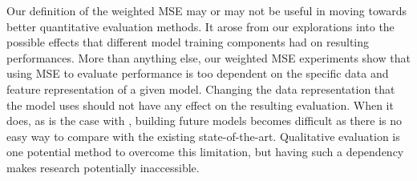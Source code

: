 Our definition of the weighted MSE may or may not be useful in moving towards better quantitative evaluation methods. It arose from our explorations into the possible effects that different model training components had on resulting performances. More than anything else, our weighted MSE experiments show that using MSE to evaluate performance is too dependent on the specific data and feature representation of a given model. Changing the data representation that the model uses should not have any effect on the resulting evaluation. When it does, as is the case with \vnet{}, building future models becomes difficult as there is no easy way to compare with the existing state-of-the-art. Qualitative evaluation is one potential method to overcome this limitation, but having such a dependency makes research potentially inaccessible.  

